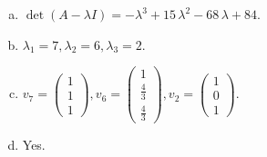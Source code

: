 \begin{questions}
\begin{solution}
\begin{enumerate}[(a)]
\item $\det(A-\lambda I)=-{\lambda}^{3} + 15 \, {\lambda}^{2} - 68 \, {\lambda} + 84$.
\item ${\lambda}_1=7, {\lambda}_2=6, {\lambda}_3=2$.
\item $v_{7}=\left(\begin{array}{r}
1 \\
1 \\
1
\end{array}\right), v_{6}=\left(\begin{array}{r}
1 \\
\frac{4}{3} \\
\frac{4}{3}
\end{array}\right), v_{2}=\left(\begin{array}{r}
1 \\
0 \\
1
\end{array}\right)$.
\item Yes.
\end{enumerate}
\end{solution}

\end{questions}

\newpage


\begin{center}
\end{center}

